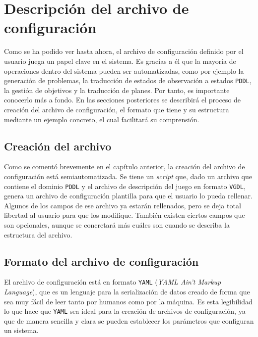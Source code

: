 
\chapter{Descripción del archivo de configuración}

Como se ha podido ver hasta ahora, el archivo de configuración definido por el usuario
juega un papel clave en el sistema. Es gracias a él que la mayoría de operaciones dentro
del sistema pueden ser automatizadas, como por ejemplo la generación de problemas, la
traducción de estados de observación a estados \texttt{PDDL}, la gestión de objetivos
y la traducción de planes. Por tanto, es importante conocerlo más a fondo. En las secciones
posteriores se describirá el proceso de creación del archivo de configuración, el formato
que tiene y su estructura mediante un ejemplo concreto, el cual facilitará su comprensión.

\section{Creación del archivo}

Como se comentó brevemente en el capítulo anterior, la creación del archivo de configuración
está semiautomatizada. Se tiene un \textit{script} que, dado un archivo que contiene el dominio
\texttt{PDDL} y el archivo de descripción del juego en formato \texttt{VGDL}, genera un archivo
de configuración plantilla para que el usuario lo pueda rellenar. Algunos de los campos de
ese archivo ya estarán rellenados, pero se deja total libertad al usuario para que los modifique.
También existen ciertos campos que son opcionales, aunque se concretará más cuáles son cuando
se describa la estructura del archivo.

\section{Formato del archivo de configuración}

El archivo de configuración está en formato \texttt{YAML} (\textit{YAML Ain't Markup Language}),
que es un lenguaje para la serialización de datos creado de forma que sea muy fácil de leer tanto
por humanos como por la máquina. Es esta legibilidad lo que hace que \texttt{YAML} sea ideal para
la creación de archivos de configuración, ya que de manera sencilla y clara se pueden establecer
los parámetros que configuran un sistema.

